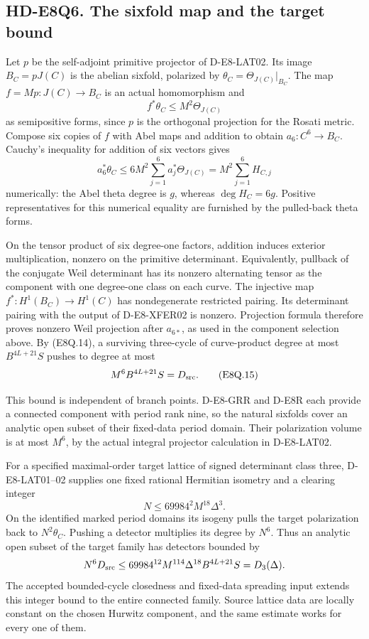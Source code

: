 \subsection*{HD-E8Q6. The sixfold map and the target bound}

Let \(p\) be the self-adjoint primitive projector of
D-E8-LAT02. Its image \(B_C=pJ(C)\) is the abelian sixfold,
polarized by \(\theta_C=\Theta_{J(C)}|_{B_C}\).
The map \(f=Mp:J(C)\to B_C\) is an actual homomorphism and
\[
                    f^*\theta_C\le M^2\Theta_{J(C)}          \tag{E8Q.13}
\]
as semipositive forms, since \(p\) is the orthogonal
projection for the Rosati metric. Compose six copies of
\(f\) with Abel maps and addition to obtain
\(a_6:C^6\to B_C\). Cauchy's inequality for addition
of six vectors gives
\[
 a_6^*\theta_C\le6M^2\sum_{j=1}^6a_j^*\Theta_{J(C)}
                     =M^2\sum_{j=1}^6H_{C,j}                \tag{E8Q.14}
\]
numerically: the Abel theta degree is \(g\), whereas
\(\deg H_C=6g\). Positive representatives for this
numerical equality are furnished by the pulled-back
theta forms.

On the tensor product of six degree-one factors, addition
induces exterior multiplication, nonzero on the primitive
determinant. Equivalently, pullback of the conjugate Weil
determinant has its nonzero alternating tensor as the
component with one degree-one class on each curve.
The injective map \(f^*:H^1(B_C)\to H^1(C)\) has
nondegenerate restricted pairing. Its determinant pairing
with the output of D-E8-XFER02 is nonzero. Projection
formula therefore proves nonzero Weil projection after
\(a_{6*}\), as used in the component selection above.
By (E8Q.14), a surviving three-cycle of curve-product
degree at most \(B^{4L+21}S\) pushes to degree at most
\[
                    M^6B^{4L+21}S=D_{\rm src}.              \tag{E8Q.15}
\]

This bound is independent of branch points.
D-E8-GRR and D-E8R each provide a connected component
with period rank nine, so the natural sixfolds cover an
analytic open subset of their fixed-data period domain.
Their polarization volume is at most \(M^6\), by the
actual integral projector calculation in D-E8-LAT02.

For a specified maximal-order target lattice of signed
determinant class three, D-E8-LAT01--02 supplies one fixed
rational Hermitian isometry and a clearing integer
\[
                      N\le69984^2M^{18}\Delta^3.
\]
On the identified marked period domains its isogeny
pulls the target polarization back to \(N^2\theta_C\).
Pushing a detector multiplies its degree by \(N^6\).
Thus an analytic open subset of the target family has
detectors bounded by
\[
 N^6D_{\rm src}
       \le69984^{12}M^{114}\Delta^{18}B^{4L+21}S=D_3(\Delta).
\]
The accepted bounded-cycle closedness and fixed-data
spreading input extends this integer bound to the entire
connected family. Source lattice data are locally constant
on the chosen Hurwitz component, and the same estimate
works for every one of them.

